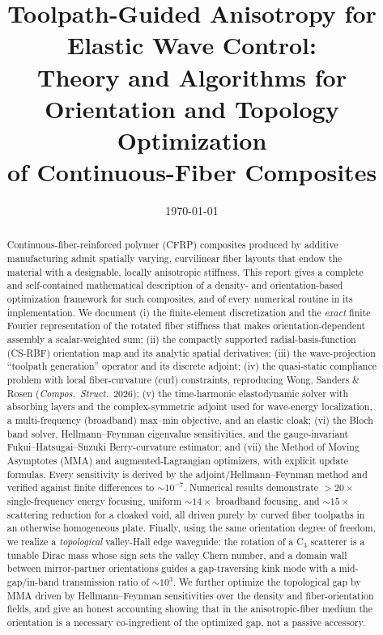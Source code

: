 \documentclass[11pt]{article}
\title{\bfseries Toolpath-Guided Anisotropy for Elastic Wave Control:\\
Theory and Algorithms for Orientation and Topology Optimization\\
of Continuous-Fiber Composites}
\author{}
\date{\today}
\begin{document}
\maketitle

\begin{abstract}
Continuous-fiber-reinforced polymer (CFRP) composites produced by additive
manufacturing admit spatially varying, curvilinear fiber layouts that endow the
material with a designable, locally anisotropic stiffness. This report gives a
complete and self-contained mathematical description of a density- and
orientation-based optimization framework for such composites, and of every
numerical routine in its implementation. We document (i) the finite-element
discretization and the \emph{exact} finite Fourier representation of the rotated
fiber stiffness that makes orientation-dependent assembly a scalar-weighted sum;
(ii) the compactly supported radial-basis-function (CS-RBF) orientation map and
its analytic spatial derivatives; (iii) the wave-projection ``toolpath
generation'' operator and its discrete adjoint; (iv) the quasi-static compliance
problem with local fiber-curvature (curl) constraints, reproducing Wong, Sanders
\& Rosen (\emph{Compos.\ Struct.}\ 2026); (v) the time-harmonic elastodynamic
solver with absorbing layers and the complex-symmetric adjoint used for
wave-energy localization, a multi-frequency (broadband) max--min objective, and
an elastic cloak; (vi) the Bloch band solver, Hellmann--Feynman eigenvalue
sensitivities, and the gauge-invariant Fukui--Hatsugai--Suzuki Berry-curvature
estimator; and (vii) the Method of Moving Asymptotes (MMA) and augmented-Lagrangian
optimizers, with explicit update formulas. Every sensitivity is derived by the
adjoint/Hellmann--Feynman method and verified against finite differences to
$\sim\!10^{-7}$. Numerical results demonstrate $>\!20\times$ single-frequency
energy focusing, uniform $\sim\!14\times$ broadband focusing, and $\sim\!15\times$
scattering reduction for a cloaked void, all driven purely by curved fiber
toolpaths in an otherwise homogeneous plate. Finally, using the same orientation
degree of freedom, we realize a \emph{topological} valley-Hall edge waveguide:
the rotation of a C$_3$ scatterer is a tunable Dirac mass whose sign sets the
valley Chern number, and a domain wall between mirror-partner orientations
guides a gap-traversing kink mode with a mid-gap/in-band transmission ratio of
$\sim\!10^3$. We further optimize the topological gap by MMA driven by
Hellmann--Feynman sensitivities over the density and fiber-orientation fields,
and give an honest accounting showing that in the anisotropic-fiber medium the
orientation is a necessary co-ingredient of the optimized gap, not a passive
accessory.
\end{abstract}
\end{document}
